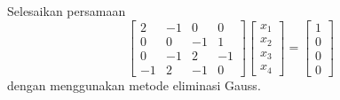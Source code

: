 Selesaikan persamaan
\begin{equation*}
\begin{bmatrix}
2 & -1 & 0 & 0 \\
0 & 0 & -1 & 1 \\
0 & -1 & 2 & -1 \\
-1 & 2 & -1 & 0
\end{bmatrix}
\begin{bmatrix}
x_{1} \\
x_{2} \\
x_{3} \\
x_{4}
\end{bmatrix} =
\begin{bmatrix}
1 \\
0 \\
0 \\
0
\end{bmatrix}
\end{equation*}
dengan menggunakan metode eliminasi Gauss.